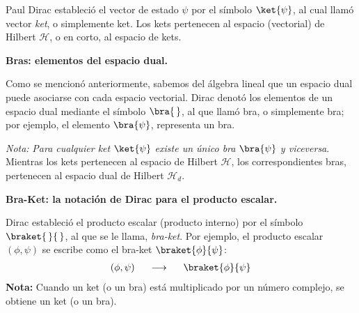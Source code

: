 Paul Dirac estableció el vector de estado $\psi$ por el símbolo $\ket{\psi}$, al cual llamó vector \emph{ket}, o simplemente ket. Los kets pertenecen al espacio (vectorial) de Hilbert $\mathcal{H}$, o en corto, al espacio de kets.
\par
\textbf{Bras: elementos del espacio dual.}

Como se mencionó anteriormente, sabemos del álgebra lineal que un espacio dual puede asociarse con cada espacio vectorial. Dirac denotó los elementos de un espacio dual mediante el símbolo $\bra{ \, }$, al que llamó bra, o simplemente bra; por ejemplo, el elemento $\bra{\psi}$, representa un bra.
\par
\textit{Nota: } \emph{Para cualquier ket $\ket{\psi}$ existe un único bra $\bra{\psi}$ y viceversa}. Mientras los kets pertenecen al espacio de Hilbert $\mathcal{H}$, los correspondientes bras, pertenecen al espacio dual de Hilbert $\mathcal{H}_{d}$.
\par
\textbf{Bra-Ket: la notación de Dirac para el producto escalar.}

Dirac estableció el producto escalar (producto interno) por el símbolo $\braket{\,}{\,}$, al que se le llama, \emph{bra-ket}. Por ejemplo, el producto escalar $(\phi, \psi)$ se escribe como el bra-ket $\braket{\phi}{\psi}$:
\begin{align}
(\phi, \psi) \hspace{0.5cm} \longrightarrow \hspace{0.5cm} \braket{\phi}{\psi}
\label{eq:ecuacion_02_24}
\end{align}
\textbf{Nota: } Cuando un ket (o un bra) está multiplicado por un número complejo, se obtiene un ket (o un bra).

